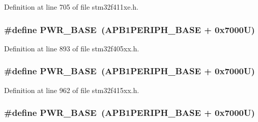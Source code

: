 Definition at line 705 of file stm32f411xe.\+h.

\subsubsection[{\texorpdfstring{P\+W\+R\+\_\+\+B\+A\+SE}{PWR_BASE}}]{\setlength{\rightskip}{0pt plus 5cm}\#define P\+W\+R\+\_\+\+B\+A\+SE~({\bf A\+P\+B1\+P\+E\+R\+I\+P\+H\+\_\+\+B\+A\+SE} + 0x7000\+U)}\hypertarget{group___peripheral__registers__structures_gac691ec23dace8b7a649a25acb110217a}{}\label{group___peripheral__registers__structures_gac691ec23dace8b7a649a25acb110217a}


Definition at line 893 of file stm32f405xx.\+h.

\subsubsection[{\texorpdfstring{P\+W\+R\+\_\+\+B\+A\+SE}{PWR_BASE}}]{\setlength{\rightskip}{0pt plus 5cm}\#define P\+W\+R\+\_\+\+B\+A\+SE~({\bf A\+P\+B1\+P\+E\+R\+I\+P\+H\+\_\+\+B\+A\+SE} + 0x7000\+U)}\hypertarget{group___peripheral__registers__structures_gac691ec23dace8b7a649a25acb110217a}{}\label{group___peripheral__registers__structures_gac691ec23dace8b7a649a25acb110217a}


Definition at line 962 of file stm32f415xx.\+h.

\subsubsection[{\texorpdfstring{P\+W\+R\+\_\+\+B\+A\+SE}{PWR_BASE}}]{\setlength{\rightskip}{0pt plus 5cm}\#define P\+W\+R\+\_\+\+B\+A\+SE~({\bf A\+P\+B1\+P\+E\+R\+I\+P\+H\+\_\+\+B\+A\+SE} + 0x7000\+U)}\hypertarget{group___peripheral__registers__structures_gac691ec23dace8b7a649a25acb110217a}{}\label{group___peripheral__registers__structures_gac691ec23dace8b7a649a25acb110217a}


